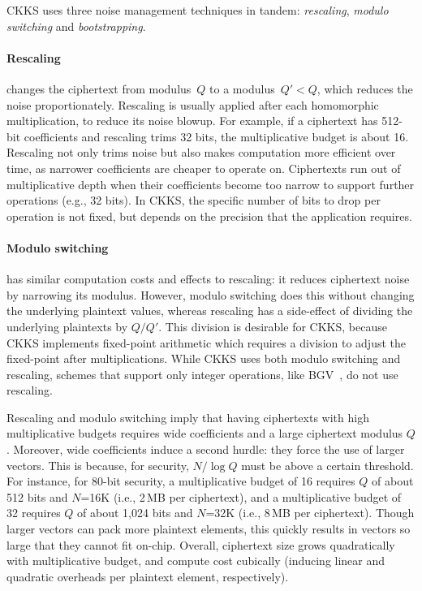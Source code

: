 CKKS uses three noise management techniques in tandem: \emph{rescaling},
\emph{modulo switching} and \emph{bootstrapping}.


\paragraph{Rescaling} changes the ciphertext from modulus~$Q$ to a modulus~$Q'
< Q$, which reduces the noise proportionately. Rescaling is usually applied
after each homomorphic multiplication, to reduce its noise blowup. For example,
if a ciphertext has 512-bit coefficients and rescaling trims 32 bits, the
multiplicative budget is about 16. Rescaling not only trims noise but also
makes computation more efficient over time, as narrower coefficients are
cheaper to operate on. Ciphertexts run out of multiplicative depth when their
coefficients become too narrow to support further operations (e.g., 32 bits).
In CKKS, the specific number of bits to drop per operation is not fixed, but
depends on the precision that the application requires.

\paragraph{Modulo switching} has similar computation costs and effects to
rescaling: it reduces ciphertext noise by narrowing its modulus. However,
modulo switching does this without changing the underlying plaintext values,
whereas rescaling has a side-effect of dividing the underlying plaintexts by
$Q/Q'$. This division is desirable for CKKS, because CKKS implements
fixed-point arithmetic which requires a division to adjust the fixed-point
after multiplications. While CKKS uses both modulo switching and rescaling,
schemes that support only integer operations, like
BGV~\cite{brakerski:toct14:leveled}, do not use rescaling.

Rescaling and modulo switching imply that having ciphertexts with high
multiplicative budgets requires wide coefficients and a large ciphertext
modulus $Q$. Moreover, wide coefficients induce a second hurdle: they force the
use of larger vectors. This is because, for security, $N/\log Q$ must be above
a certain threshold. For instance, for 80-bit security, a multiplicative budget
of 16 requires $Q$ of about 512 bits and $N$=16K (i.e., 2\,MB per ciphertext),
and a multiplicative budget of 32 requires $Q$ of about 1,024 bits and $N$=32K
(i.e., 8\,MB per ciphertext). Though larger vectors can pack more plaintext
elements, this quickly results in vectors so large that they cannot fit
on-chip. Overall, ciphertext size grows quadratically with multiplicative
budget, and compute cost cubically (inducing linear and quadratic overheads per
plaintext element, respectively).


